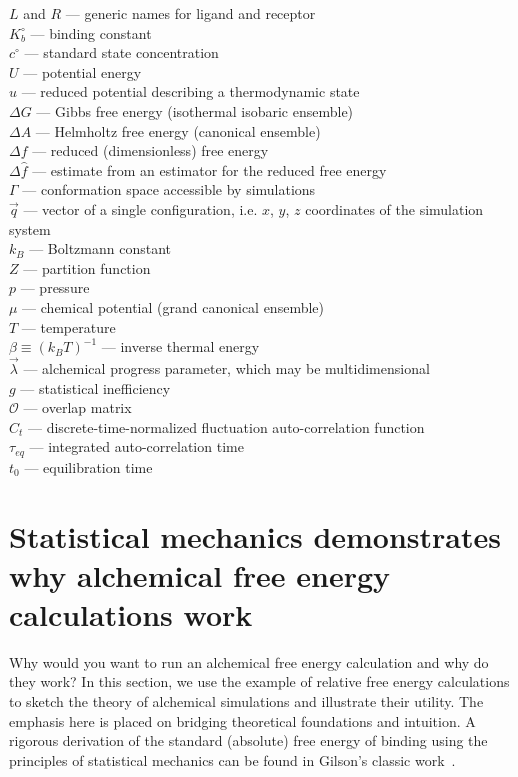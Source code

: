 \documentclass[9pt,bestpractices]{livecoms}
\begin{document}
\begin{tcolorbox}[title=List of Symbols, colback=green!10!white]
$L$ and $R$ --- generic names for ligand and receptor\\
$K_b^{\circ}$ --- binding  constant \\
$c^{\circ}$ --- standard state concentration \\
$U$ --- potential energy\\
$u$ --- reduced potential describing a thermodynamic state \\
$\Delta G$ --- Gibbs free energy (isothermal isobaric ensemble)\\
$\Delta A$ --- Helmholtz free energy (canonical ensemble)\\
$\Delta f$ --- reduced (dimensionless) free energy \\
$\Delta \hat{f}$ --- estimate from an estimator for the reduced free energy\\
$\Gamma$ --- conformation space accessible by simulations \\
$\vec{q}$ --- vector of a single configuration, i.e. $x$, $y$, $z$ coordinates of the simulation system\\
$k_B$ --- Boltzmann constant \\
$Z$ --- partition function \\
$p$ --- pressure \\
$\mu$ --- chemical potential (grand canonical ensemble)\\
$T$ --- temperature \\
$\beta \equiv (k_B T)^{-1}$ --- inverse thermal energy \\
$\vec{\lambda}$ --- alchemical progress parameter, which may be multidimensional \\
$g$ --- statistical inefficiency\\
$\mathcal{O}$ --- overlap matrix\\
$C_t$ --- discrete-time-normalized fluctuation auto-correlation function\\
$\tau _{eq}$ --- integrated auto-correlation time\\
$t_0$ --- equilibration time
\end{tcolorbox}

\section{Statistical mechanics demonstrates why alchemical free energy calculations work}
\label{sec:theory}
Why would you want to run an alchemical free energy calculation and why do they work?
In this section, we use the example of relative free energy calculations to sketch the theory of alchemical simulations and illustrate their utility.
The emphasis here is placed on bridging theoretical foundations and intuition.
A rigorous derivation of the standard (absolute) free energy of binding using the principles of statistical mechanics can be found in Gilson's classic work~\cite{gilson1997statisticalthermodynamic}.
\end{document}
